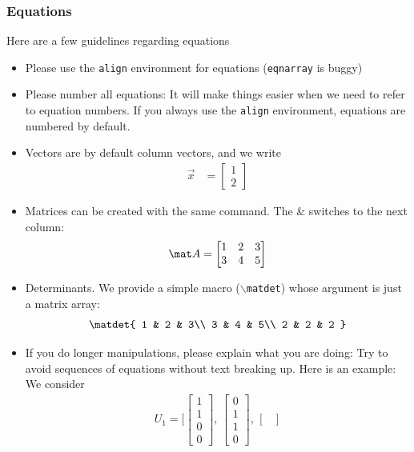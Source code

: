\documentclass[12pt,twoside]{article}
\begin{document}
\subsubsection{Equations}
Here are a few guidelines regarding equations
\begin{itemize}
\item Please use the \texttt{align} environment for equations (\texttt{eqnarray} is buggy)
\item Please number all equations: It will make things easier when we need to refer to equation numbers. If you always use the \texttt{align} environment, equations are numbered by default.
\item Vectors are by default column vectors, and we write 
\begin{align}
\vec x &= \begin{bmatrix}
1 \\ 2 
\end{bmatrix}
\end{align}
\item Matrices can be created with the same command. The \& switches to the next column:
\begin{align}
\mat A = \begin{bmatrix}
1 & 2 & 3\\
3 & 4 & 5
\end{bmatrix}
\end{align}
\item Determinants. We provide a simple macro (\texttt{$\backslash$matdet}) whose argument is just a matrix array:
\begin{align}
\matdet{
1 & 2 & 3\\
3 & 4 & 5\\
2 & 2 & 2
}
\end{align}
\item If you do longer manipulations, please explain what you are doing: Try to avoid sequences of equations without text breaking up. Here is an example:
We consider
\begin{align}
U_1 = [
\begin{bmatrix}
1\\1\\0\\0
\end{bmatrix}
,\,
\begin{bmatrix}
0 \\ 1\\1\\0
\end{bmatrix}
,\,
\begin{bmatrix}

\end{bmatrix}
\end{align}
\end{itemize}
\end{document}
